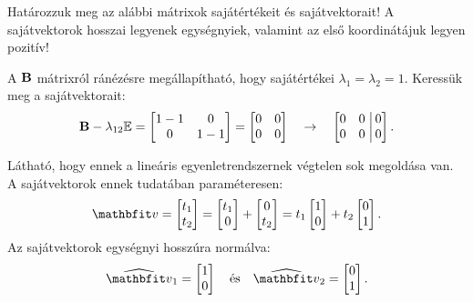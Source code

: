\begin{exercise}{%
    Határozzuk meg az alábbi mátrixok sajátértékeit és sajátvektorait!
    A sajátvektorok hosszai legyenek egységnyiek, valamint az első koordinátájuk
    legyen pozitív!
  }
{  A $\mathbf{B}$ mátrixról ránézésre megállapítható, hogy sajátértékei $\lambda_1
    = \lambda_2 = 1$. Keressük meg a sajátvektorait:
  \[
    \mathbf{B} - \lambda_{12} {\mathbb{E}} = \begin{bmatrix}
      1 - 1 & 0     \\
      0     & 1 - 1
    \end{bmatrix} = \begin{bmatrix}
      0 & 0 \\
      0 & 0
    \end{bmatrix}
    \quad \rightarrow \quad
    \left[\begin{matrix}
        0 & 0 \\
        0 & 0
      \end{matrix}\right.\left|\begin{matrix}
        \,0 \\ \,0
      \end{matrix}\right]
    \text.
  \]

  Látható, hogy ennek a lineáris egyenletrendszernek végtelen sok megoldása van.
  A sajátvektorok ennek tudatában paraméteresen:
  \[
    \rvec v = \begin{bmatrix}
      t_1 \\ t_2
    \end{bmatrix} = \begin{bmatrix}
      t_1 \\ 0
    \end{bmatrix} + \begin{bmatrix}
      0 \\ t_2
    \end{bmatrix} = t_1 \begin{bmatrix}
      1 \\ 0
    \end{bmatrix} + t_2 \begin{bmatrix}
      0 \\ 1
    \end{bmatrix}
    \text{.}
  \]
  Az sajátvektorok egységnyi hosszúra normálva:
  \[
    \uvec v_1 = \begin{bmatrix}
      1 \\ 0
    \end{bmatrix}
    \quad \text{és} \quad
    \uvec v_2 = \begin{bmatrix}
      0 \\ 1
    \end{bmatrix}
    \text{.}
  \]

  \tcbline

}
\end{exercise}
